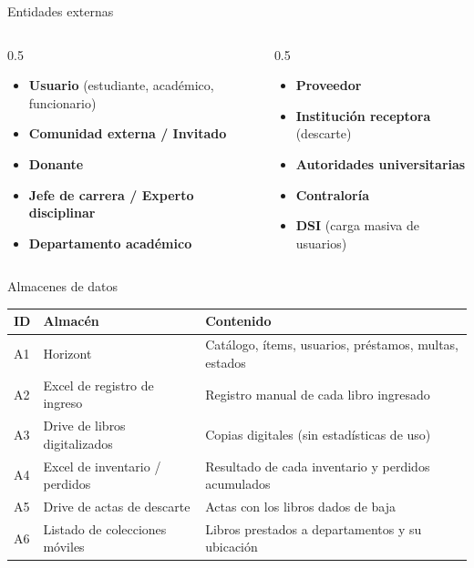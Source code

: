 \documentclass[aspectratio=169,10pt]{beamer}
\begin{document}
\begin{frame}{Entidades externas}
  \begin{columns}[T]
    \begin{column}{0.5\textwidth}
      \begin{itemize}\small
        \item \textbf{Usuario} (estudiante, académico, funcionario)
        \item \textbf{Comunidad externa / Invitado}
        \item \textbf{Donante}
        \item \textbf{Jefe de carrera / Experto disciplinar}
        \item \textbf{Departamento académico}
      \end{itemize}
    \end{column}
    \begin{column}{0.5\textwidth}
      \begin{itemize}\small
        \item \textbf{Proveedor}
        \item \textbf{Institución receptora} (descarte)
        \item \textbf{Autoridades universitarias}
        \item \textbf{Contraloría}
        \item \textbf{DSI} (carga masiva de usuarios)
      \end{itemize}
    \end{column}
  \end{columns}
\end{frame}

\begin{frame}{Almacenes de datos}
  \small
  \begin{tabularx}{\textwidth}{@{}l l X@{}}
    \toprule
    \textbf{ID} & \textbf{Almacén} & \textbf{Contenido} \\
    \midrule
    A1 & Horizont                       & Catálogo, ítems, usuarios, préstamos, multas, estados \\
    A2 & Excel de registro de ingreso   & Registro manual de cada libro ingresado \\
    A3 & Drive de libros digitalizados  & Copias digitales (sin estadísticas de uso) \\
    A4 & Excel de inventario / perdidos & Resultado de cada inventario y perdidos acumulados \\
    A5 & Drive de actas de descarte     & Actas con los libros dados de baja \\
    A6 & Listado de colecciones móviles & Libros prestados a departamentos y su ubicación \\
    \bottomrule
  \end{tabularx}

  
\end{frame}
\end{document}
